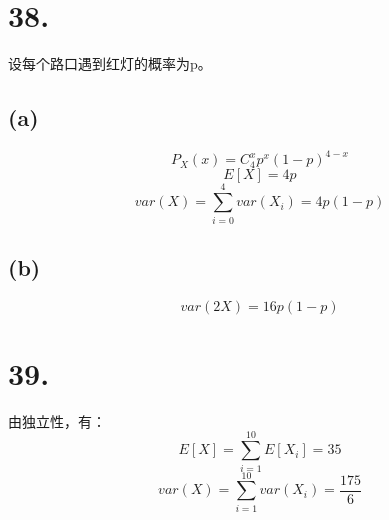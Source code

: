 \documentclass[UTF8]{report}
\begin{document}
    \section*{38.}
        设每个路口遇到红灯的概率为p。
        \subsection*{(a)}
            $$P_X(x) = C_4^xp^x(1 - p)^{4 - x}$$
            $$E[X] = 4p$$
            $$var(X) = \sum_{i = 0}^4var(X_i) = 4p(1 - p)$$
        \subsection*{(b)}
            $$var(2X) = 16p(1 - p)$$
    \section*{39.}
        由独立性，有：
        $$E[X] = \sum_{i = 1}^{10}E[X_i] = 35$$
        $$var(X) = \sum_{i = 1}^{10}var(X_i) = \frac{175}{6}$$
\end{document}
